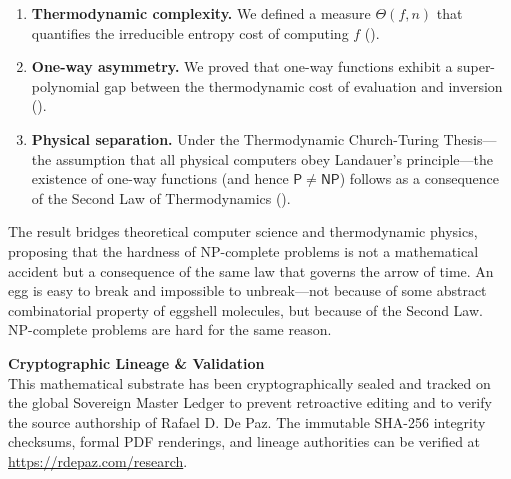 \documentclass[12pt, a4paper]{article}
\theoremstyle{plain}
\theoremstyle{definition}
\theoremstyle{remark}
\newcommand{\Pc}{\mathsf{P}}
\newcommand{\NPc}{\mathsf{NP}}
\begin{document}
\begin{enumerate}
  \item \textbf{Thermodynamic complexity.} We defined a measure $\Theta(f,n)$
    that quantifies the irreducible entropy cost of computing $f$
    ().
  \item \textbf{One-way asymmetry.} We proved that one-way functions
    exhibit a super-polynomial gap between the thermodynamic cost of
    evaluation and inversion ().
  \item \textbf{Physical separation.} Under the Thermodynamic Church-Turing
    Thesis---the assumption that all physical computers obey Landauer's
    principle---the existence of one-way functions (and hence
    $\Pc \neq \NPc$) follows as a consequence of the Second Law of
    Thermodynamics ().
\end{enumerate}

The result bridges theoretical computer science and thermodynamic physics,
proposing that the hardness of NP-complete problems is not a mathematical
accident but a consequence of the same law that governs the arrow of time.
An egg is easy to break and impossible to unbreak---not because of some
abstract combinatorial property of eggshell molecules, but because of
the Second Law. NP-complete problems are hard for the same reason.


\vspace{2em}
\noindent\hrulefill
\vspace{1em}

\noindent\textbf{Cryptographic Lineage \& Validation}\\
This mathematical substrate has been cryptographically sealed and tracked on the global Sovereign Master Ledger to prevent retroactive editing and to verify the source authorship of Rafael D. De Paz. The immutable SHA-256 integrity checksums, formal PDF renderings, and lineage authorities can be verified at \url{https://rdepaz.com/research}.



\end{document}
